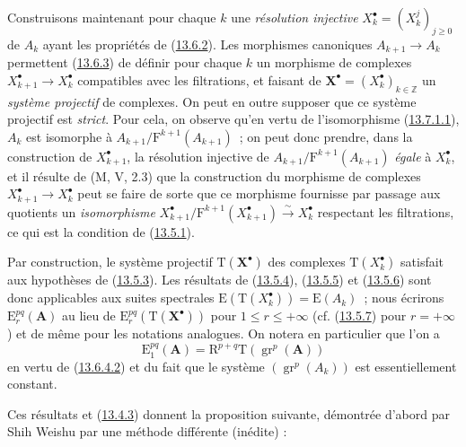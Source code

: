 \begin{env}[13.7.2]
\label{0.13.7.2-fr}
Construisons maintenant pour chaque $k$ une \emph{résolution injective}
$X_k^\bullet=(X_k^j)_{j\geq0}$ de $A_k$ ayant les propriétés de
(\hyperref[0.13.6.2-fr]{13.6.2}). Les morphismes canoniques
$A_{k+1}\to A_k$ permettent
(\hyperref[0.13.6.3-fr]{13.6.3}) de définir pour chaque $k$ un morphisme
de complexes $X_{k+1}^\bullet\to X_k^\bullet$ compatibles
avec les
filtrations, et faisant de
$\mathbf X^\bullet=(X_k^\bullet)_{k\in\mathbb Z}$ un \emph{système projectif}
de complexes.
On peut en outre supposer que ce système projectif est \emph{strict}. Pour
cela, on observe qu'en vertu de l'isomorphisme
(\hyperref[0.13.7.1.1-fr]{13.7.1.1}), $A_k$ est isomorphe à
$A_{k+1}/\mathrm F^{k+1}(A_{k+1})$~; on peut donc prendre, dans la
construction de $X_{k+1}^\bullet$, la résolution injective de
$A_{k+1}/\mathrm F^{k+1}(A_{k+1})$ \emph{égale} à $X_k^\bullet$, et il résulte
de (M, V, 2.3) que la construction du morphisme de complexes
$X_{k+1}^\bullet\to X_k^\bullet$ peut se faire de sorte que ce morphisme
fournisse par passage aux quotients un \emph{isomorphisme}
$X_{k+1}^\bullet/\mathrm F^{k+1}(X_{k+1}^\bullet)
\xrightarrow{\sim}X_k^\bullet$
respectant les filtrations, ce qui est la condition de
(\hyperref[0.13.5.1-fr]{13.5.1}).
\end{env}

\begin{env}[13.7.3]
\label{0.13.7.3-fr}
Par construction, le système projectif $\mathrm T(\mathbf X^\bullet)$
des complexes $\mathrm T(X_k^\bullet)$ satisfait aux hypothèses de
(\hyperref[0.13.5.3-fr]{13.5.3}). Les résultats de
(\hyperref[0.13.5.4-fr]{13.5.4}),
(\hyperref[0.13.5.5-fr]{13.5.5}) et
(\hyperref[0.13.5.6-fr]{13.5.6}) sont donc applicables aux suites
spectrales $\mathrm E(\mathrm T(X_k^\bullet))=\mathrm E(A_k)$~; nous
écrirons $\mathrm E_r^{pq}(\mathbf A)$ au lieu de
$\mathrm E_r^{pq}(\mathrm T(\mathbf X^\bullet))$ pour
$1\leq r\leq+\infty$ (cf. (\hyperref[0.13.5.7-fr]{13.5.7}) pour
$r=+\infty$) et de même pour les notations analogues. On notera en
particulier que l'on a
\begin{equation}
\label{0.13.7.3.1-fr}
\tag{13.7.3.1}
\mathrm E_1^{pq}(\mathbf A)=
\mathrm R^{p+q}\mathrm T(\operatorname{gr}^p(\mathbf A))
\end{equation}
en vertu de (\hyperref[0.13.6.4.2-fr]{13.6.4.2}) et du fait que le
système $(\operatorname{gr}^p(A_k))$ est essentiellement constant.

Ces résultats et (\hyperref[0.13.4.3-fr]{13.4.3}) donnent la proposition
suivante, démontrée d'abord par Shih Weishu par une méthode différente
(inédite) :
\end{env}

